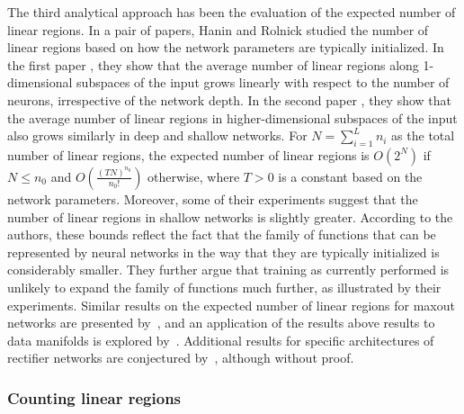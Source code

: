 The third analytical approach has been the evaluation of the expected number of linear regions. 
In a pair of papers, Hanin and Rolnick studied the number of linear regions based on how the network parameters are typically initialized.  
In the first paper \citep{hanin2019complexity}, 
they show that the average number of linear regions along 1-dimensional subspaces of the input grows linearly with respect to the number of neurons, irrespective of the network depth. 
In the second paper \citep{hanin2019deep}, 
they show that the average number of linear regions in higher-dimensional subspaces of the input also grows similarly in deep and shallow networks. 
For $N = \sum_{i=1}^L n_i$ as the total number of linear regions, 
the expected number of linear regions is  $O(2^N)$ if $N \leq n_0$ and $O\left(\frac{(T N)^{n_0}}{n_0!}\right)$ otherwise, 
where $T > 0$ is a constant based on the network parameters. 
Moreover, some of their experiments suggest that the number of linear regions in shallow networks is slightly greater. 
According to the authors, 
these bounds reflect the fact that the family of functions that can be represented by neural networks in the way that they are typically initialized is considerably smaller. 
They further argue that training as currently performed is unlikely to expand the family of functions much further, as illustrated by their experiments. 
% 
Similar results on the expected number of linear regions for maxout networks are presented by~\cite{tseran2021expected}, 
and an application of the results above results to data manifolds is explored by~\cite{tiwari2022manifolds}. 
Additional results for specific architectures of rectifier networks are conjectured by~\cite{wang2022estimation}, although without proof.




\subsubsection{Counting linear regions}\label{sec:number_counting}


